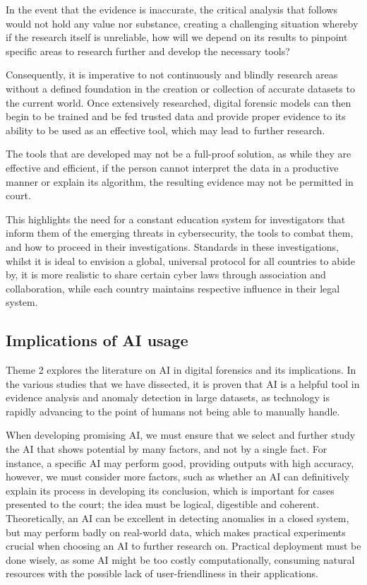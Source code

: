 \documentclass[12pt,a4paper]{article}
\begin{document}
 In the event that the evidence is inaccurate, the critical analysis that follows would not hold any value nor substance, creating a challenging situation whereby if the research itself is unreliable, how will we depend on its results to pinpoint specific areas to research further and develop the necessary tools? 

Consequently, it is imperative to not continuously and blindly research areas without a defined foundation in the creation or collection of accurate datasets to the current world.  Once extensively researched, digital forensic models can then begin to be trained and be fed trusted data and provide proper evidence to its ability to be used as an effective tool, which may lead to further research. 

The tools that are developed may not be a full-proof solution, as while they are effective and efficient, if the person cannot interpret the data in a productive manner or explain its algorithm, the resulting evidence may not be permitted in court. 

This highlights the need for a constant education system for investigators that inform them of the emerging threats in cybersecurity, the tools to combat them, and how to proceed in their investigations. Standards in these investigations, whilst it is ideal to envision a global, universal protocol for all countries to abide by, it is more realistic to share certain cyber laws through association and collaboration, while each country maintains respective influence in their legal system.

\subsection{Implications of AI usage}

Theme 2 explores the literature on AI in digital forensics and its implications. In the various studies that we have dissected,  it is proven that AI is a helpful tool in evidence analysis and anomaly detection in large datasets, as technology is rapidly advancing to the point of humans not being able to manually handle. 

When developing promising AI, we must ensure that we select and further study the AI that shows potential by many factors, and not by a single fact. For instance, a specific AI may perform good, providing outputs with high accuracy, however, we must consider more factors, such as whether an AI can definitively explain its process in developing its conclusion, which is important for cases presented to the court; the idea must be logical, digestible and coherent. Theoretically, an AI can be excellent in detecting anomalies in a closed system, but may perform badly on real-world data, which makes practical experiments crucial when choosing an AI to further research on. Practical deployment must be done wisely, as some AI might be too costly computationally, consuming natural resources with the possible lack of user-friendliness in their applications. 
\end{document}
